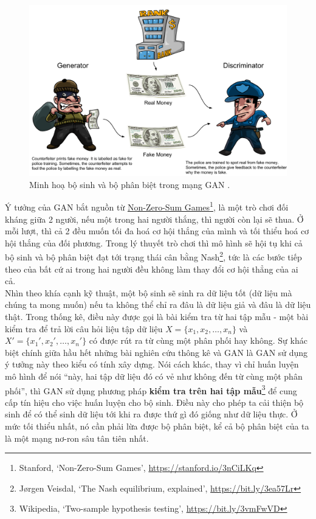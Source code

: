 \documentclass[a4paper, 12pt]{article}
\begin{document}
\begin{figure}[!h]
\captionsetup{width=0.8\textwidth}
\centering
\includegraphics[width=12cm]{images/2_7.png}
\caption{Minh hoạ bộ sinh và bộ phân biệt trong mạng GAN \cite{richardgan2018}.}
\end{figure}

\noindent
Ý tưởng của GAN bắt nguồn từ \href{https://cs.stanford.edu/people/eroberts/courses/soco/projects/1998-99/game-theory/nonzero.html}{Non-Zero-Sum Games}\footnote{Stanford, \lq Non-Zero-Sum Games\rq, \href{https://stanford.io/3nCiLKq}{https://stanford.io/3nCiLKq}}, là một trò chơi đối kháng giữa 2 người, nếu một trong hai người thắng, thì người còn lại sẽ thua. Ở mỗi lượt, thì cả 2 đều muốn tối đa hoá cơ hội thắng của mình và tối thiểu hoá cơ hội thắng của đối phương. Trong lý thuyết trò chơi thì mô hình sẽ hội tụ khi cả bộ sinh và bộ phân biệt đạt tới trạng thái cân bằng Nash\footnote{Jørgen Veisdal, \lq The Nash equilibrium, explained\rq, \href{https://bit.ly/3ea57Lr}{https://bit.ly/3ea57Lr}}, tức là các bước tiếp theo của bất cứ ai trong hai người đều không làm thay đổi cơ hội thẳng của ai cả.\vspace{5pt}\\
Nhìn theo khía cạnh kỹ thuật, một bộ sinh sẽ sinh ra dữ liệu tốt (dữ liệu mà chúng ta mong muốn) nếu ta không thể chỉ ra đâu là dữ liệu giả và đâu là dữ liệu thật. Trong thống kê, điều này được gọi là bài kiểm tra từ hai tập mẫu - một bài kiểm tra để trả lời câu hỏi liệu tập dữ liệu $X = \{x_1, x_2, \dots, x_n\}$ và $X'=\{x_1', x_2', \dots, x_n'\}$ có được rút ra từ cùng một phân phối hay không. Sự khác biệt chính giữa hầu hết những bài nghiên cứu thông kê và GAN là GAN sử dụng ý tưởng này theo kiểu có tính xây dựng. Nói cách khác, thay vì chỉ huấn luyện mô hình để nói ``này, hai tập dữ liệu đó có vẻ như không đến từ cùng một phân phối'', thì GAN sử dụng phương pháp \textbf{kiểm tra trên hai tập mẫu}\footnote{Wikipedia, \lq Two-sample hypothesis testing\rq, \href{https://bit.ly/3vmFwVD}{https://bit.ly/3vmFwVD}} để cung cấp tín hiệu cho việc huấn luyện cho bộ sinh. Điều này cho phép ta cải thiện bộ sinh để có thể sinh dữ liệu tới khi ra được thứ gì đó giống như dữ liệu thực. Ở mức tối thiểu nhất, nó cần phải lừa được bộ phân biệt, kể cả bộ phân biệt của ta là một mạng nơ-ron sâu tân tiên nhất.
\end{document}
